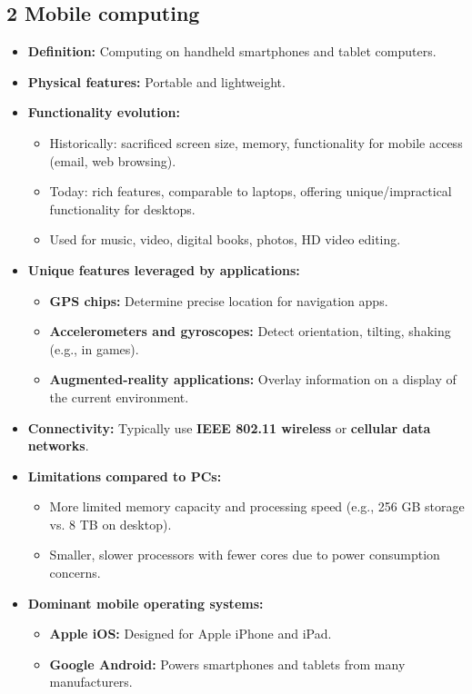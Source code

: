 \documentclass{article}
\begin{document}
\subsection*{2 Mobile computing}
\begin{itemize}
    \item \textbf{Definition:} Computing on handheld smartphones and tablet computers.
    \item \textbf{Physical features:} Portable and lightweight.
    \item \textbf{Functionality evolution:}
    \begin{itemize}
        \item Historically: sacrificed screen size, memory, functionality for mobile access (email, web browsing).
        \item Today: rich features, comparable to laptops, offering unique/impractical functionality for desktops.
        \item Used for music, video, digital books, photos, HD video editing.
    \end{itemize}
    \item \textbf{Unique features leveraged by applications:}
    \begin{itemize}
        \item \textbf{GPS chips:} Determine precise location for navigation apps.
        \item \textbf{Accelerometers and gyroscopes:} Detect orientation, tilting, shaking (e.g., in games).
        \item \textbf{Augmented-reality applications:} Overlay information on a display of the current environment.
    \end{itemize}
    \item \textbf{Connectivity:} Typically use \textbf{IEEE 802.11 wireless} or \textbf{cellular data networks}.
    \item \textbf{Limitations compared to PCs:}
    \begin{itemize}
        \item More limited memory capacity and processing speed (e.g., 256 GB storage vs. 8 TB on desktop).
        \item Smaller, slower processors with fewer cores due to power consumption concerns.
    \end{itemize}
    \item \textbf{Dominant mobile operating systems:}
    \begin{itemize}
        \item \textbf{Apple iOS:} Designed for Apple iPhone and iPad.
        \item \textbf{Google Android:} Powers smartphones and tablets from many manufacturers.
    \end{itemize}
\end{itemize}
\end{document}
